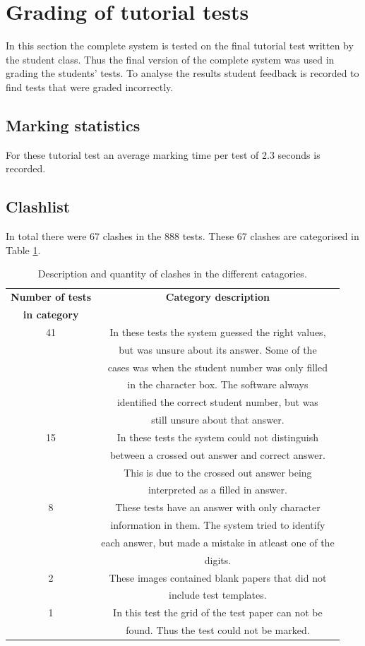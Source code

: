 \section{Grading of tutorial tests}
In this section the complete system is tested on the final tutorial test written by the student class. Thus the final version of the complete system was used in grading the students' tests. To analyse the results student feedback is recorded to find tests that were graded incorrectly. 

\subsection{Marking statistics}

For these tutorial test  an average marking time per test of 2.3 seconds is recorded.

\subsection{Clashlist}

In total there were 67 clashes in the 888 tests. These 67 clashes are categorised in Table  \ref{tbl:TutClash}.
\begin{table}
  \centering
  \caption{Description and quantity of clashes in the different catagories.} \label{tbl:TutClash}
\begin{tabular}{|c|c|}
\hline
\textbf{Number of tests} & \textbf{Category description}\\
\textbf{in category} &\\
\hline
41&In these tests the system guessed the right values,\\ 
&but was unsure about its answer. Some of the\\
&cases was when the student number was only filled\\
&in the character box. The software always\\
&identified the correct student number, but was\\
&still unsure about that answer.\\
\hline
15&In these tests the system could not distinguish\\ 
&between a crossed out answer and correct answer.\\
&This is due to the crossed out answer being\\
&interpreted as a filled in answer.\\
\hline
8&These tests have an answer with only character\\ 
&information in them. The system tried to identify\\
&each answer, but made a mistake in atleast one of the\\
&digits.\\
\hline
2&These images contained blank papers that did not\\ 
&include test templates.\\
\hline
1&In this test the grid of the test paper can not be\\ 
&found. Thus the test could not be marked.\\
\hline
\end{tabular}
\end{table}


